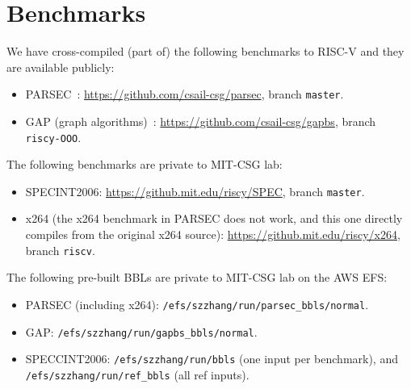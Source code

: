 \documentclass[12pt]{article}
\newcommand{\code}[1]{\texttt{#1}}
\begin{document}
\section{Benchmarks}\label{sec:bench}
We have cross-compiled (part of) the following benchmarks to RISC-V and they are available publicly:
\begin{itemize}
    \item PARSEC~\cite{bienia11benchmarking}: \url{https://github.com/csail-csg/parsec}, branch \code{master}.
    \item GAP (graph algorithms)~\cite{beamer2015gap}: \url{https://github.com/csail-csg/gapbs}, branch \code{riscy-OOO}.
\end{itemize}
The following benchmarks are private to MIT-CSG lab:
\begin{itemize}
    \item SPECINT2006: \url{https://github.mit.edu/riscy/SPEC}, branch \code{master}.
    \item x264 (the x264 benchmark in PARSEC does not work, and this one directly compiles from the original x264 source): \url{https://github.mit.edu/riscy/x264}, branch \code{riscv}.
\end{itemize}
The following pre-built BBLs are private to MIT-CSG lab on the AWS EFS:
\begin{itemize}
    \item PARSEC (including x264): \code{/efs/szzhang/run/parsec\_bbls/normal}.
    \item GAP: \code{/efs/szzhang/run/gapbs\_bbls/normal}.
    \item SPECCINT2006: \code{/efs/szzhang/run/bbls} (one input per benchmark), and  \\ \code{/efs/szzhang/run/ref\_bbls} (all ref inputs).
\end{itemize}



\end{document}
